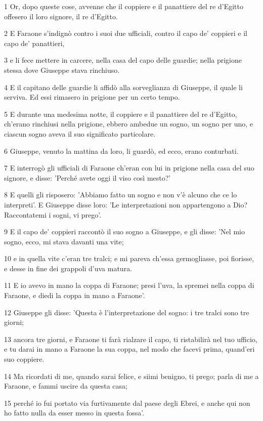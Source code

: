 \par 1 Or, dopo queste cose, avvenne che il coppiere e il panattiere del re d'Egitto offesero il loro signore, il re d'Egitto.
\par 2 E Faraone s'indignò contro i suoi due ufficiali, contro il capo de' coppieri e il capo de' panattieri,
\par 3 e li fece mettere in carcere, nella casa del capo delle guardie; nella prigione stessa dove Giuseppe stava rinchiuso.
\par 4 E il capitano delle guardie li affidò alla sorveglianza di Giuseppe, il quale li serviva. Ed essi rimasero in prigione per un certo tempo.
\par 5 E durante una medesima notte, il coppiere e il panattiere del re d'Egitto, ch'erano rinchiusi nella prigione, ebbero ambedue un sogno, un sogno per uno, e ciascun sogno aveva il suo significato particolare.
\par 6 Giuseppe, venuto la mattina da loro, li guardò, ed ecco, erano conturbati.
\par 7 E interrogò gli ufficiali di Faraone ch'eran con lui in prigione nella casa del suo signore, e disse: 'Perché avete oggi il viso così mesto?'
\par 8 E quelli gli risposero: 'Abbiamo fatto un sogno e non v'è alcuno che ce lo interpreti'. E Giuseppe disse loro: 'Le interpretazioni non appartengono a Dio? Raccontatemi i sogni, vi prego'.
\par 9 E il capo de' coppieri raccontò il suo sogno a Giuseppe, e gli disse: 'Nel mio sogno, ecco, mi stava davanti una vite;
\par 10 e in quella vite c'eran tre tralci; e mi pareva ch'essa germogliasse, poi fiorisse, e desse in fine dei grappoli d'uva matura.
\par 11 E io avevo in mano la coppa di Faraone; presi l'uva, la spremei nella coppa di Faraone, e diedi la coppa in mano a Faraone'.
\par 12 Giuseppe gli disse: 'Questa è l'interpretazione del sogno: i tre tralci sono tre giorni;
\par 13 ancora tre giorni, e Faraone ti farà rialzare il capo, ti ristabilirà nel tuo ufficio, e tu darai in mano a Faraone la sua coppa, nel modo che facevi prima, quand'eri suo coppiere.
\par 14 Ma ricordati di me, quando sarai felice, e siimi benigno, ti prego; parla di me a Faraone, e fammi uscire da questa casa;
\par 15 perché io fui portato via furtivamente dal paese degli Ebrei, e anche qui non ho fatto nulla da esser messo in questa fossa'.
